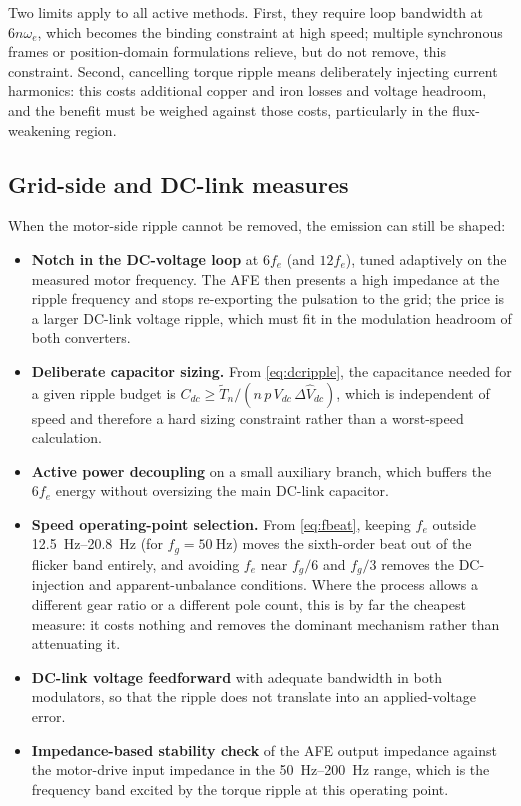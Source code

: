 \documentclass[11pt,a4paper]{article}
\begin{document}
Two limits apply to all active methods. First, they require loop bandwidth at
$6n\omega_{e}$, which becomes the binding constraint at high speed; multiple
synchronous frames or position-domain formulations relieve, but do not remove,
this constraint. Second, cancelling torque ripple means deliberately injecting
current harmonics: this costs additional copper and iron losses and voltage
headroom, and the benefit must be weighed against those costs, particularly in
the flux-weakening region.

\subsection{Grid-side and DC-link measures}

When the motor-side ripple cannot be removed, the emission can still be shaped:

\begin{itemize}
\item \textbf{Notch in the DC-voltage loop} at $6f_{e}$ (and $12f_{e}$), tuned
      adaptively on the measured motor frequency. The AFE then presents a high
      impedance at the ripple frequency and stops re-exporting the pulsation to
      the grid; the price is a larger DC-link voltage ripple, which must fit in
      the modulation headroom of both converters.
\item \textbf{Deliberate capacitor sizing.} From \eqref{eq:dcripple}, the
      capacitance needed for a given ripple budget is
      $C_{dc}\geq \tilde{T}_{n}/(n\,p\,V_{dc}\,\Delta \hat{V}_{dc})$, which is
      independent of speed and therefore a hard sizing constraint rather than a
      worst-speed calculation.
\item \textbf{Active power decoupling} on a small auxiliary branch, which
      buffers the $6f_{e}$ energy without oversizing the main DC-link capacitor.
\item \textbf{Speed operating-point selection.} From \eqref{eq:fbeat}, keeping
      $f_{e}$ outside \SIrange{12.5}{20.8}{\hertz} (for $f_{g}=\SI{50}{\hertz}$)
      moves the sixth-order beat out of the flicker band entirely, and avoiding
      $f_{e}$ near $f_{g}/6$ and $f_{g}/3$ removes the DC-injection and
      apparent-unbalance conditions. Where the process allows a different gear
      ratio or a different pole count, this is by far the cheapest measure: it
      costs nothing and removes the dominant mechanism rather than attenuating
      it.
\item \textbf{DC-link voltage feedforward} with adequate bandwidth in both
      modulators, so that the ripple does not translate into an applied-voltage
      error.
\item \textbf{Impedance-based stability check} of the AFE output impedance
      against the motor-drive input impedance in the \SIrange{50}{200}{\hertz}
      range, which is the frequency band excited by the torque ripple at this
      operating point.
\end{itemize}
\end{document}
